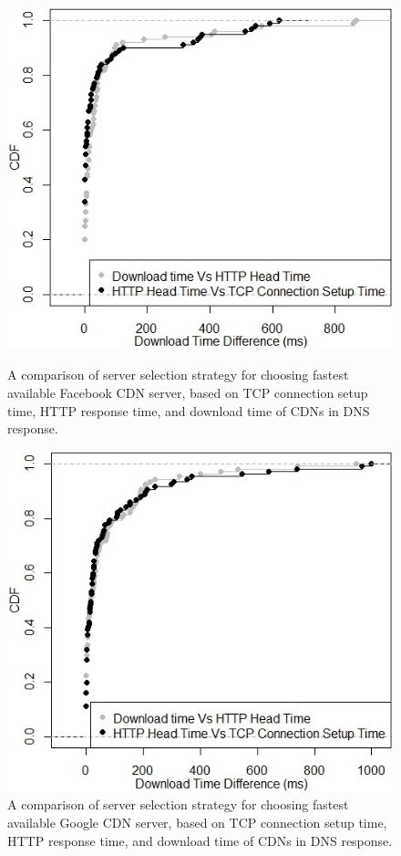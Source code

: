 \documentclass{llncs}
\begin{document}
\begin{figure}
  \includegraphics[width=\linewidth]{figures/server_selection_facebook}
  \caption{A comparison of server selection strategy for choosing fastest available Facebook CDN server, based on TCP connection setup time, HTTP response time, and download time of CDNs in DNS response.}
  \label{fig:server_selection_criteria_facebook}
\endminipage\hfill
{}%
  \includegraphics[width=\linewidth]{figures/server_selection_google}
  \caption{A comparison of server selection strategy for choosing fastest available Google CDN server, based on TCP connection setup time, HTTP response time, and download time of CDNs in DNS response.}
   \label{fig:server_selection_criteria_google}
\endminipage
\end{figure}
\end{document}

